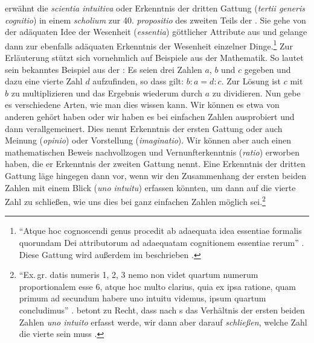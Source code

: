  erwähnt die
\emph{scientia intuitiva} oder Erkenntnis der dritten Gattung (\emph{tertii
generis cognitio}) in einem \emph{scholium} zur 40. \emph{propositio} des
zweiten Teils der . Sie gehe von der adäquaten Idee der Wesenheit
(\emph{essentia}) göttlicher Attribute aus und gelange dann zur ebenfalls
adäquaten Erkenntnis der Wesenheit einzelner Dinge.\footnote{\enquote{Atque
hoc cognoscendi genus procedit ab adaequata idea essentiae formalis quorundam
Dei attributorum ad adaequatam cognitionem essentiae rerum}
\parencite[][2p40s2]{Spinoza:EthikingeometrischerOrdnungdargestellt2007}. Diese
Gattung wird außerdem im 
beschrieben
\parencite[vgl.][II: 10.20--21, 11.13--19]{Spinoza:SpinozaOpera1972}.} Zur
Erläuterung stützt sich
 vornehmlich auf
Beispiele aus der Mathematik. So lautet sein bekanntes Beispiel aus der
: Es seien drei Zahlen $a$, $b$ und $c$ gegeben und dazu eine
vierte Zahl $d$ aufzufinden, so dass gilt: $b:a = d:c$. Zur Lösung ist $c$ mit
$b$ zu multiplizieren und das Ergebnis wiederum durch $a$ zu dividieren.
Nun gebe es verschiedene Arten, wie man dies wissen kann. Wir können es etwa von
anderen gehört haben oder wir
haben es bei einfachen Zahlen ausprobiert und dann verallgemeinert. Dies nennt
 Erkenntnis der
ersten Gattung oder auch Meinung (\emph{opinio}) oder Vorstellung
(\emph{imaginatio}). Wir können aber auch einen mathematischen Beweis
nachvollzogen und Vernunfterkenntnis (\emph{ratio}) erworben haben, die er
Erkenntnis der zweiten Gattung nennt. Eine Erkenntnis der dritten Gattung läge
hingegen dann vor, wenn wir den Zusammenhang der ersten beiden Zahlen mit einem
Blick (\emph{uno intuitu}) erfassen könnten, um dann auf die vierte Zahl zu
schließen, wie uns dies bei ganz einfachen Zahlen möglich
sei.\footnote{\enquote{Ex.\,gr. datis numeris 1, 2, 3 nemo non videt quartum
numerum proportionalem esse 6, atque hoc multo clarius, quia ex ipsa ratione,
quam primum ad secundum habere uno intuitu videmus, ipsum quartum concludimus}
\parencite[][2p40s2]{Spinoza:EthikingeometrischerOrdnungdargestellt2007}.
 betont zu Recht,
dass nach s
 das Verhältnis der ersten beiden Zahlen \emph{uno intuito}
erfasst werde, wir dann aber darauf \emph{schließen}, welche Zahl die vierte sein muss
\parencite[vgl.][\pno~144\,f.]{Matheron:SpinozaandEuclideanArithmetic1986}.}

